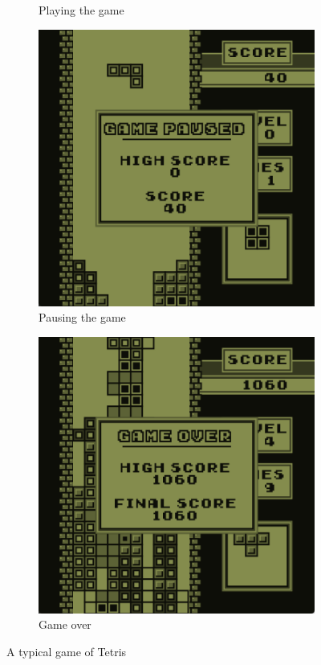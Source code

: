 \begin{figure}[H]
\begin{subfigure}[b]{0.45\textwidth}
        \caption{Playing the game}
        \label{fig: game}
    \end{subfigure}
    \begin{subfigure}[b]{0.45\textwidth}
        \centering
        \includegraphics[width=\textwidth]{Figures/day_5/game_paused.png}
        \caption{Pausing the game}
        \label{fig: paused game}
    \end{subfigure}
    \hspace{1cm}
    \begin{subfigure}[b]{0.45\textwidth}
        \centering
        \includegraphics[width=\textwidth]{Figures/day_5/game_over.png}
        \caption{Game over}
        \label{fig: game over}
    \end{subfigure}

    \caption{A typical game of Tetris}
    \label{fig: tetris}

\end{figure}